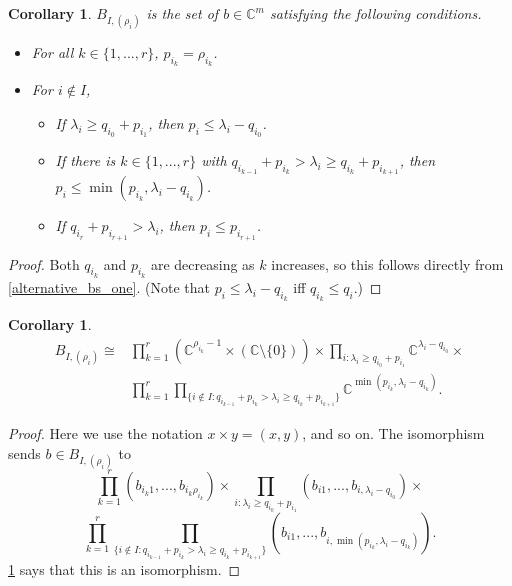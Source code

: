 \documentclass[12pt,psamsfonts]{article}
\newtheorem{corollary}[theorem]{Corollary}
\begin{document}
\begin{corollary}\label{alternative_bs_two}
    \(B_{I, (\rho_i)}\) is the set of \(b \in \mathbb{C}^m\) satisfying the following conditions.
    \begin{itemize}
        \item For all \(k \in \{1, ..., r\}\), \(p_{i_k} = \rho_{i_k}\).
        \item For \(i \notin I\),
        \begin{itemize}
            \item If \(\lambda_i \geq q_{i_0} + p_{i_1}\), then \(p_i \leq \lambda_i - q_{i_0}\).
            \item If there is \(k \in \{1, ..., r\}\) with \(q_{i_{k - 1}} + p_{i_k} > \lambda_i \geq q_{i_k} + p_{i_{k + 1}}\), then \(p_i \leq \min(p_{i_k}, \lambda_i - q_{i_k})\).
            \item If \(q_{i_r} + p_{i_{r + 1}} > \lambda_i\), then \(p_i \leq p_{i_{r + 1}}\).
        \end{itemize}
    \end{itemize}
\end{corollary}
\begin{proof}
    Both \(q_{i_k}\) and \(p_{i_k}\) are decreasing as \(k\) increases, so this follows directly from \cref{alternative_bs_one}.
    (Note that \(p_i \leq \lambda_i - q_{i_k}\) iff \(q_{i_k} \leq q_i\).)
\end{proof}

\begin{corollary}\label{bs_iso}
    \begin{align*}
        B_{I, (\rho_i)} \cong & \prod_{k = 1}^r (\mathbb{C}^{\rho_{i_k} - 1} \times (\mathbb{C} \setminus \{0\})) \times \prod_{i : \lambda_i \geq q_{i_0} + p_{i_1}} \mathbb{C}^{\lambda_i - q_{i_0}} \times \\
        & \prod_{k = 1}^r \prod_{\{i \notin I : q_{i_{k - 1}} + p_{i_k} > \lambda_i \geq q_{i_k} + p_{i_{k + 1}}\}}\mathbb{C}^{\min(p_{i_k}, \lambda_i - q_{i_k})}.
    \end{align*}
\end{corollary}
\begin{proof}
    Here we use the notation \(x \times y = (x, y)\), and so on.
    The isomorphism sends \(b \in B_{I, (\rho_i)}\) to 
    \[\prod_{k = 1}^{r}(b_{i_k1},..., b_{i_k\rho_{i_k}}) \times \prod_{i : \lambda_i \geq q_{i_0} + p_{i_1}} (b_{i1}, ..., b_{i, \lambda_i - q_{i_0}}) \times\]
    \[\prod_{k = 1}^r \prod_{\{i \notin I : q_{i_{k - 1}} + p_{i_k} > \lambda_i \geq q_{i_k} + p_{i_{k + 1}}\}} (b_{i1}, ..., b_{i,\min(p_{i_k}, \lambda_i - q_{i_k})}).\]
    \cref{alternative_bs_two} says that this is an isomorphism.
\end{proof}
\end{document}
